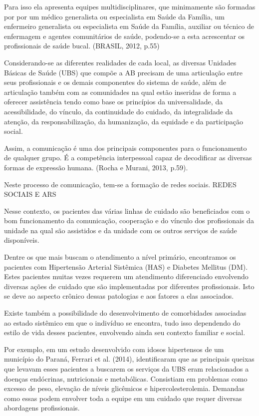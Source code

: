 Para isso ela apresenta equipes multidisciplinares, que minimamente são formadas por por um médico generalista ou especialista em Saúde da Família, um enfermeiro generalista ou especialista em Saúde da Família, auxiliar ou técnico de enfermagem e agentes comunitários de saúde, podendo-se a esta acrescentar os profissionais de saúde bucal. (BRASIL, 2012, p.55)

Considerando-se as diferentes realidades de cada local, as diversas Unidades Básicas de Saúde (UBS) que compõe a AB precisam de uma articulação entre seus profissionais e os demais componentes do sistema de saúde, além de articulação também com as comunidades na qual estão inseridas de forma a oferecer assistência tendo como base os princípios da universalidade, da acessibilidade, do vínculo, da continuidade do cuidado, da integralidade da atenção, da responsabilização, da humanização, da equidade e da participação social.

Assim, a comunicação é uma dos principais componentes para o funcionamento de qualquer grupo. É a competência interpessoal capaz de decodificar as diversas formas de expressão humana. (Rocha e Murani, 2013, p.59).

Neste processo de comunicação, tem-se a formação de redes sociais. REDES SOCIAIS E ARS

Nesse contexto, os pacientes das várias linhas de cuidado são beneficiados com o bom funcionamento da comunicação, cooperação e do vínculo dos profissionais da unidade na qual são assistidos e da unidade com os outros serviços de saúde disponíveis. 

Dentre os que mais buscam o atendimento a nível primário, encontramos os pacientes com Hipertensão Arterial Sistêmica (HAS) e Diabetes Mellitus (DM). Estes pacientes muitas vezes requerem um atendimento diferenciado envolvendo diversas ações de cuidado que são implementadas por diferentes profissionais. Isto se deve ao aspecto crônico dessas patologias e aos fatores a elas associados. 

Existe também a possibilidade do desenvolvimento de comorbidades associadas ao estado sistêmico em que o indivíduo se encontra, tudo isso dependendo do estilo de vida desses pacientes, envolvendo ainda seu contexto familiar e social. 

Por exemplo, em um estudo desenvolvido com idosos hipertensos de um município do Paraná, Ferrari et al. (2014), identificaram que as principais queixas que levavam esses pacientes a buscarem os serviços da UBS eram relacionados a doenças endócrinas, nutricionais e metabólicas. Consistiam em problemas como excesso de peso, elevação de níveis glicêmicos e hipercolesterolemia. Demandas como essas podem envolver toda a equipe em um cuidado que requer diversas abordagens profissionais. 

